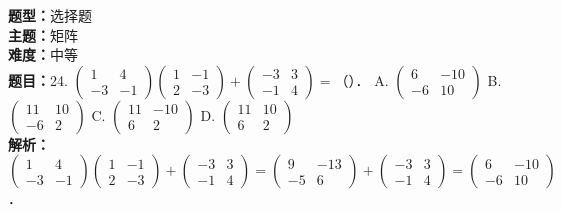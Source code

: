 \documentclass{ctexart}
\newenvironment{question}[5]{%
	\noindent\textbf{题型：}#1\\
	\textbf{主题：}#2\\
	\textbf{难度：}#3\\
	\textbf{题目：}#4\\
	\textbf{解析：}#5\\
	\vspace{1em}
}{}
\begin{document}
	\begin{question}
		{选择题}
		{矩阵}
		{中等}
		{24. \(\left(\begin{array}{cc}1 & 4 \\ -3 & -1\end{array}\right)\left(\begin{array}{cc}1 & -1 \\ 2 & -3\end{array}\right)+\left(\begin{array}{cc}-3 & 3 \\ -1 & 4\end{array}\right)=\)（）．
			A. \(\left(\begin{array}{cc}6 & -10 \\ -6 & 10\end{array}\right)\)
			B. \(\left(\begin{array}{cc}11 & 10 \\ -6 & 2\end{array}\right)\)
			C. \(\left(\begin{array}{cc}11 & -10 \\ 6 & 2\end{array}\right)\)
			D. \(\left(\begin{array}{cc}11 & 10 \\ 6 & 2\end{array}\right)\)}
		{\(\left(\begin{array}{cc}1 & 4 \\ -3 & -1\end{array}\right)\left(\begin{array}{cc}1 & -1 \\ 2 & -3\end{array}\right)+\left(\begin{array}{cc}-3 & 3 \\ -1 & 4\end{array}\right)=\left(\begin{array}{cc}9 & -13 \\ -5 & 6\end{array}\right)+\left(\begin{array}{cc}-3 & 3 \\ -1 & 4\end{array}\right)=\left(\begin{array}{cc}6 & -10 \\ -6 & 10\end{array}\right)\)．}
	\end{question}
	
\end{document}
